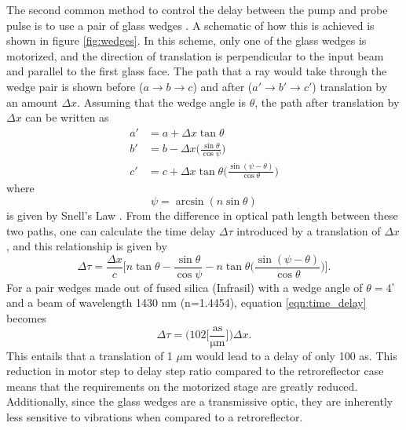 The second common method to control the delay between the pump and probe pulse is to use a pair of glass wedges \cite{chirlaAttosecondPulseGeneration2011, gormanAttosecondProbingElectron2018, kiesewetterDynamicsNearThresholdAttosecond2019}. A schematic of how this is achieved is shown in figure \ref{fig:wedges}.  In this scheme, only one of the glass wedges is motorized, and the direction of translation is perpendicular to the input beam and parallel to the first glass face.  The path that a ray would take through the wedge pair is shown before ($a\rightarrow b\rightarrow c$) and after ($a' \rightarrow b'\rightarrow c'$) translation by an amount $\Delta x$.  Assuming that the wedge angle is $\theta$, the path after translation by $\Delta x$ can be written as
\begin{align}
\label{eqn:path_lengths}
	a'&=a+\Delta x \tan\theta\\
	b'&=b-\Delta x \bigg(\frac{\sin\theta}{\cos\psi}\bigg)\\
	c'&=c+\Delta x \tan\theta\bigg(\frac{\sin(\psi-\theta)}{\cos\theta}\bigg)
\end{align}
where
\begin{equation}
	\psi = \arcsin(n\sin\theta)
\end{equation}
is given by Snell's Law \cite{pedrottiIntroductionOptics2007}. From the difference in optical path length between these two paths, one can calculate the time delay $\Delta\tau$ introduced by a translation of $\Delta x$, and this relationship is given by
\begin{equation}
\label{eqn:time_delay}
	\Delta\tau = \frac{\Delta x}{c}\Bigg[n\tan\theta - \frac{\sin\theta}{\cos\psi}-n\tan\theta\bigg(\frac{\sin(\psi-\theta)}{\cos\theta}\bigg)\Bigg].
\end{equation}
For a pair wedges made out of fused silica (Infrasil) with a wedge angle of $\theta=4^\circ$ and a beam of wavelength 1430 nm (n=1.4454), equation \ref{eqn:time_delay} becomes
\begin{equation}
\label{eqn:numerical_relationship_wedges}
	\Delta\tau = \Bigg(102 \bigg[\frac{\mathrm{as}}{\mathrm{\mu m}}\bigg]\Bigg)\Delta x.
\end{equation}
This entails that a translation of 1 $\mu$m would lead to a delay of only 100 as.  This reduction in motor step to delay step ratio compared to the retroreflector case means that the requirements on the motorized stage are greatly reduced.  Additionally, since the glass wedges are a transmissive optic, they are inherently less sensitive to vibrations when compared to a retroreflector.

